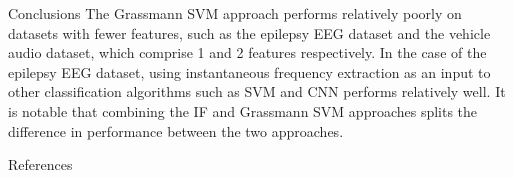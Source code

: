 \documentclass[final]{beamer}
\newlength{\onecolwid}
\newlength{\twocolwid}
\begin{document}
\begin{frame}[t]
\begin{columns}[t]
\begin{column}{\twocolwid}
\begin{columns}[t,totalwidth=\twocolwid]
\begin{column}{\onecolwid}
\begin{block}{Conclusions}
    The Grassmann SVM approach performs relatively poorly on datasets with fewer features, such as
    the epilepsy EEG dataset and the vehicle audio dataset, which comprise 1 and 2 features
    respectively. In the case of the epilepsy EEG dataset, using instantaneous frequency extraction
    as an input to other classification algorithms such as SVM and CNN performs relatively well. It
    is notable that combining the IF and Grassmann SVM approaches splits the difference in
    performance between the two approaches.
\end{block}


\begin{block}{References}

\footnotesize{
\vspace{0.75in}}

\end{block}


\end{column}    %

\end{columns}   %

\end{column}    %


% 
% 
% 



\end{columns}
\end{frame}
\end{document}
